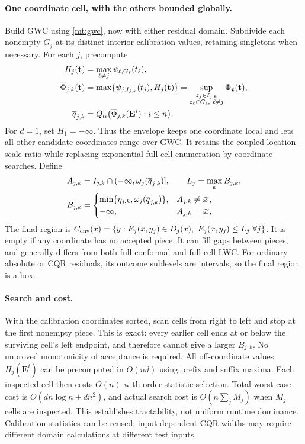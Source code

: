 \paragraph{One coordinate cell, with the others bounded globally.}
Build GWC using \eqref{mt:gwc}, now with either residual domain. Subdivide
each nonempty $G_j$ at its distinct interior calibration values, retaining
singletons when necessary. For each $j$, precompute
\begin{align}\label{mt:surface}
 H_j(\mathbf t)&=\max_{\ell\ne j}\psi_{\ell,G_\ell}(t_\ell),\notag\\
 \overline\Phi_{j,k}(\mathbf t)
  &=\max\{\psi_{j,I_{j,k}}(t_j),H_j(\mathbf t)\}
   =\sup_{\substack{z_j\in I_{j,k}\\z_\ell\in G_\ell,\ \ell\ne j}}
      \Phi_{\mathbf z}(\mathbf t),\notag\\
 \overline q_{j,k}&=Q_\alpha\bigl(\overline\Phi_{j,k}(\mathbf E^i):i\le n\bigr).
\end{align}
For $d=1$, set $H_1=-\infty$. Thus the envelope keeps one coordinate local
and lets all other candidate coordinates range over GWC. It retains the
coupled location--scale ratio while replacing exponential full-cell
enumeration by coordinate searches. Define
\begin{align}\label{mt:pieces}
 A_{j,k}&=I_{j,k}\cap(-\infty,\omega_j(\overline q_{j,k})],\qquad
 L_j=\max_k B_{j,k},\notag\\
 B_{j,k}&=\begin{cases}
 \min\{\eta_{j,k},\omega_j(\overline q_{j,k})\},&A_{j,k}\ne\varnothing,\\
 -\infty,&A_{j,k}=\varnothing,
 \end{cases}
\end{align}
The final region is
$C_{\rm env}(x)=\{y:E_j(x,y_j)\in D_j(x),\ E_j(x,y_j)\le L_j\ \forall j\}$.
It is empty if any coordinate has no accepted piece. It can fill gaps between
pieces, and generally differs from both full conformal and full-cell LWC.
For ordinary absolute or CQR residuals, its outcome sublevels are intervals,
so the final region is a box.

\paragraph{Search and cost.}
With the calibration coordinates sorted, scan cells from right to left and
stop at the first nonempty piece. This is exact: every earlier cell ends at
or below the surviving cell's left endpoint, and therefore cannot give a
larger $B_{j,k}$. No unproved monotonicity of acceptance is required.
All off-coordinate values $H_j(\mathbf E^i)$ can be precomputed in $O(nd)$
using prefix and suffix maxima. Each inspected cell then costs $O(n)$ with
order-statistic selection. Total worst-case cost is
$O(dn\log n+dn^2)$, and actual search cost is $O(n\sum_j M_j)$ when
$M_j$ cells are inspected. This establishes tractability, not uniform runtime
dominance. Calibration statistics can be reused; input-dependent CQR widths
may require different domain calculations at different test inputs.

